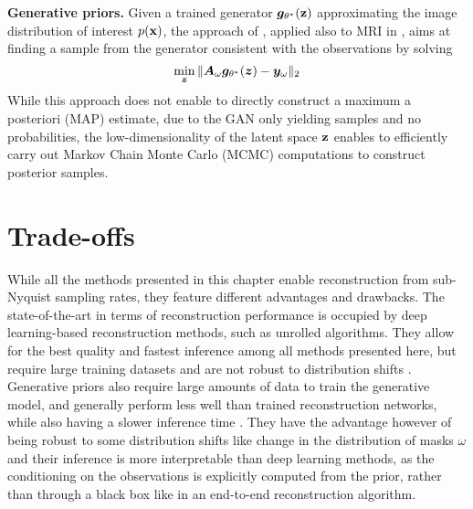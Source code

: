 \textbf{Generative priors.} Given a trained generator ${\bm{g}}_{\theta^*}({\mathbf{z}})$ approximating the image distribution of interest $p({\mathbf{x}})$, the approach of \citet{bora2017compressed}, applied also to MRI in \citet{patel2021gan}, aims at finding a sample from the generator consistent with the observations by solving 
\begin{equation}
    \min_{\bm{z}} \|{\bm{A}}_\omega {\bm{g}}_{\theta^*}({\bm{z}})-{\bm{y}}_\omega\|_2 \label{eq:generative_priors}
\end{equation}
While this approach does not enable to directly construct a maximum a posteriori (MAP) estimate, due to the GAN only yielding samples and no probabilities, the low-dimensionality of the latent space ${\mathbf{z}}$ enables to efficiently carry out Markov Chain Monte Carlo (MCMC) computations \citep{patel2021gan} to construct posterior samples.


\section{Trade-offs}
While all the methods presented in this chapter enable reconstruction from sub-Nyquist sampling rates, they feature different advantages and drawbacks. %
The state-of-the-art in terms of reconstruction performance is occupied by deep learning-based reconstruction methods, such as unrolled algorithms. They allow for the best quality and fastest inference among all methods presented here, but require large training datasets and are not robust to distribution shifts \citep{jalal2021robust,darestani2021measuring}. Generative priors also require large amounts of data to train the generative model, and generally perform less well than trained reconstruction networks, while also having a slower inference time \citep{darestani2021measuring}. They have the advantage however of being robust to some distribution shifts like change in the distribution of masks $\omega$ and their inference is more interpretable than deep learning methods, as the conditioning on the observations is explicitly computed from the prior, rather than through a black box like in an end-to-end reconstruction algorithm.

